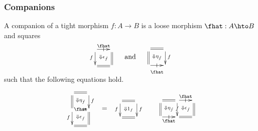 \documentclass{beamer}
\begin{document}
\begin{frame}
  \frametitle{Companions}
  A \alert{companion} of a tight morphism $f:A\to B$ is a loose morphism $\fhat : A\hto B$ and squares
  \begin{equation*}
    \begin{array}{c}
      \xymatrix@-.5pc{
        \ar[r]|-@{|}^-{\smash{\fhat}} \ar[d]_f \ar@{}[dr]|{\Downarrow \epsilon_{\hat{f}} }
        & \ar@{=}[d]\\
        \ar@{=}[r] & }
    \end{array}\quad\text{and}\quad
    \begin{array}{c}
      \xymatrix@-.5pc{
        \ar@{=}[r] \ar@{=}[d] \ar@{}[dr]|{\Downarrow \eta_{\hat{f}}}
        & \ar[d]^f\\
        \ar[r]|-@{|}_-{\smash{\raisebox{-3mm}{$\scriptstyle\fhat$}}} & }
    \end{array}
  \end{equation*}
  such that the following equations hold.
  \begin{align}\label{eq:compeqn}
    \begin{array}{c}
      \xymatrix@-.5pc{
        \ar@{=}[r] \ar@{=}[d] \ar@{}[dr]|{\Downarrow \eta_{\hat{f}}}
        & \ar[d]^f\\
        \ar[r]|-{\fhat} \ar[d]_f \ar@{}[dr]|
        {\Downarrow  \epsilon_{\hat{f}} }
        & \ar@{=}[d]\\
        \ar@{=}[r] & }
    \end{array} &= 
    \begin{array}{c}
      \xymatrix@-.5pc{ \ar@{=}[r] \ar[d]_f
        \ar@{}[dr]|{\Downarrow 1_f} &  \ar[d]^f\\
        \ar@{=}[r] & }
    \end{array}
    &
    \begin{array}{c}
      \xymatrix@-.5pc{
        \ar@{=}[r] \ar@{=}[d] \ar@{}[dr]|{ \Downarrow \eta_{\hat{f}}}&
        \ar[r]|-@{|}^{\fhat}\ar[d]|f \ar@{}[dr]|{\Downarrow  \epsilon_{\hat{f}} }
        & \ar@{=}[d]\\
        \ar[r]|-@{|}_-{\fhat} &
        \ar@{=}[r] &}

\end{array}
\end{align}
\end{frame}
\end{document}
